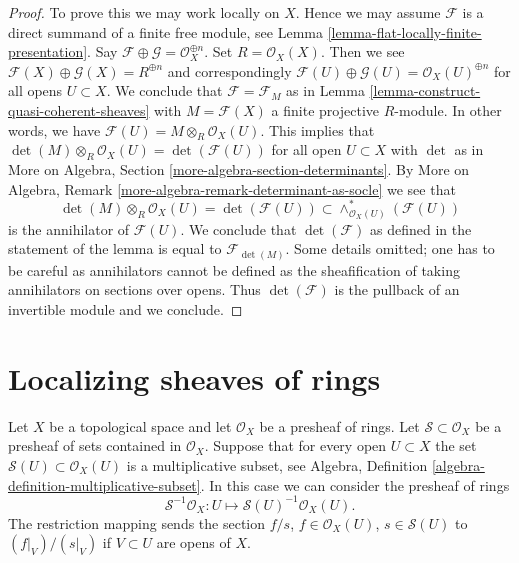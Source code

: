 \documentclass{stacks-project}
\theoremstyle{plain}
\theoremstyle{definition}
\theoremstyle{remark}
\numberwithin{equation}{subsection}
\begin{document}
\begin{proof}
To prove this we may work locally on $X$. Hence we may assume $\mathcal{F}$
is a direct summand of a finite free module, see
Lemma \ref{lemma-flat-locally-finite-presentation}. Say
$\mathcal{F} \oplus \mathcal{G} = \mathcal{O}_X^{\oplus n}$.
Set $R = \mathcal{O}_X(X)$. Then we see
$\mathcal{F}(X) \oplus \mathcal{G}(X) = R^{\oplus n}$
and correspondingly
$\mathcal{F}(U) \oplus \mathcal{G}(U) = \mathcal{O}_X(U)^{\oplus n}$
for all opens $U \subset X$.
We conclude that $\mathcal{F} = \mathcal{F}_M$ as in
Lemma \ref{lemma-construct-quasi-coherent-sheaves}
with $M = \mathcal{F}(X)$ a finite projective $R$-module.
In other words, we have $\mathcal{F}(U) = M \otimes_R \mathcal{O}_X(U)$.
This implies that
$\det(M) \otimes_R \mathcal{O}_X(U) = \det(\mathcal{F}(U))$
for all open $U \subset X$ with $\det$ as in
More on Algebra, Section \ref{more-algebra-section-determinants}. By
More on Algebra, Remark \ref{more-algebra-remark-determinant-as-socle}
we see that
$$
\det(M) \otimes_R \mathcal{O}_X(U) =
\det(\mathcal{F}(U)) \subset
\wedge^*_{\mathcal{O}_X(U)}(\mathcal{F}(U))
$$
is the annihilator of $\mathcal{F}(U)$. We conclude that
$\det(\mathcal{F})$ as defined in the statement of the lemma
is equal to $\mathcal{F}_{\det(M)}$. Some details omitted; one has
to be careful as annihilators cannot be defined as the sheafification
of taking annihilators on sections over opens. Thus $\det(\mathcal{F})$
is the pullback of an invertible module and we conclude.
\end{proof}
















\section{Localizing sheaves of rings}
\label{section-localizing-sheaves-rings}

\noindent
Let $X$ be a topological space and let $\mathcal{O}_X$ be a
presheaf of rings. Let $\mathcal{S} \subset \mathcal{O}_X$
be a presheaf of sets contained in $\mathcal{O}_X$.
Suppose that for every open $U \subset X$ the set
$\mathcal{S}(U) \subset \mathcal{O}_X(U)$ is a multiplicative subset, see
Algebra, Definition \ref{algebra-definition-multiplicative-subset}.
In this case we can consider the presheaf of rings
$$
\mathcal{S}^{-1}\mathcal{O}_X :
U \longmapsto \mathcal{S}(U)^{-1}\mathcal{O}_X(U).
$$
The restriction mapping sends the section $f/s$, $f \in \mathcal{O}_X(U)$,
$s \in \mathcal{S}(U)$ to $(f|_V)/(s|_V)$ if $V \subset U$ are opens
of $X$.
\end{document}
